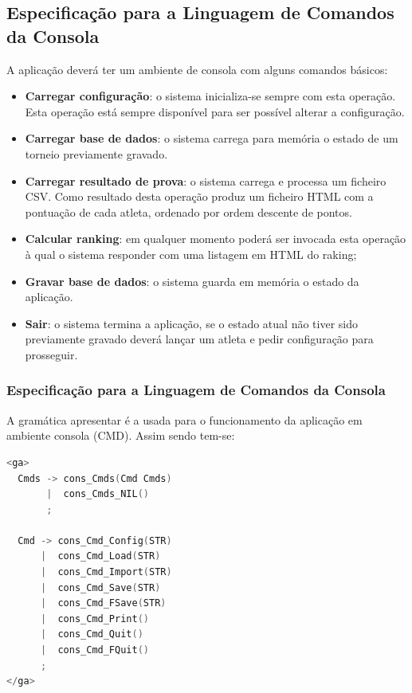\documentclass[11pt, a4paper, oneside]{article}
\begin{document}
\subsection{Especificação para a Linguagem de Comandos da Consola}
A aplicação deverá ter um ambiente de consola com alguns comandos básicos:
\begin{itemize}
\item \textbf{Carregar configuração}: o sistema inicializa-se sempre com esta operação. Esta operação está sempre disponível para ser possível alterar a configuração.
\item \textbf{Carregar base de dados}: o sistema carrega para memória o estado de um torneio previamente gravado.
\item \textbf{Carregar resultado de prova}: o sistema carrega e processa um ficheiro CSV. Como resultado desta operação produz um ficheiro HTML com a pontuação de cada atleta, ordenado por ordem descente de pontos.
\item \textbf{Calcular ranking}: em qualquer momento poderá ser invocada esta operação à qual o sistema responder com uma listagem em HTML do raking;
\item \textbf{Gravar base de dados}: o sistema guarda em memória o estado da aplicação.
\item \textbf{Sair}: o sistema termina a aplicação, se o estado atual não tiver sido previamente gravado deverá lançar um atleta e pedir configuração para prosseguir.
\end{itemize}
\subsubsection{Especificação para a Linguagem de Comandos da Consola}
A gramática apresentar é a usada para o funcionamento da aplicação em ambiente consola (CMD). Assim sendo tem-se:
\begin{lstlisting}[language=C, caption={Gramática para a linguagem de especificação para a linguagem de comandos de consola.}]
<ga>
  Cmds -> cons_Cmds(Cmd Cmds)
       |  cons_Cmds_NIL()
       ;

  Cmd -> cons_Cmd_Config(STR)
      |  cons_Cmd_Load(STR)
      |  cons_Cmd_Import(STR)
      |  cons_Cmd_Save(STR)
      |  cons_Cmd_FSave(STR)
      |  cons_Cmd_Print()
      |  cons_Cmd_Quit()
      |  cons_Cmd_FQuit()
      ;
</ga>
\end{lstlisting}
\newpage

\end{document}
